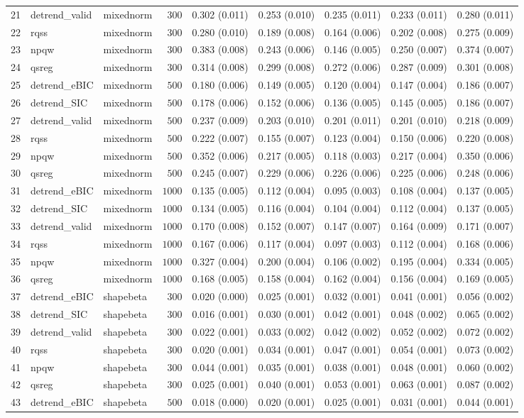 \begin{table}[!tbp]
\begin{center}
\begin{tabular}{lllrlllll}
21&detrend_valid&mixednorm&$ 300$&0.302 (0.011)&0.253 (0.010)&0.235 (0.011)&0.233 (0.011)&0.280 (0.011)\tabularnewline
22&rqss&mixednorm&$ 300$&0.280 (0.010)&0.189 (0.008)&0.164 (0.006)&0.202 (0.008)&0.275 (0.009)\tabularnewline
23&npqw&mixednorm&$ 300$&0.383 (0.008)&0.243 (0.006)&0.146 (0.005)&0.250 (0.007)&0.374 (0.007)\tabularnewline
24&qsreg&mixednorm&$ 300$&0.314 (0.008)&0.299 (0.008)&0.272 (0.006)&0.287 (0.009)&0.301 (0.008)\tabularnewline
25&detrend_eBIC&mixednorm&$ 500$&0.180 (0.006)&0.149 (0.005)&0.120 (0.004)&0.147 (0.004)&0.186 (0.007)\tabularnewline
26&detrend_SIC&mixednorm&$ 500$&0.178 (0.006)&0.152 (0.006)&0.136 (0.005)&0.145 (0.005)&0.186 (0.007)\tabularnewline
27&detrend_valid&mixednorm&$ 500$&0.237 (0.009)&0.203 (0.010)&0.201 (0.011)&0.201 (0.010)&0.218 (0.009)\tabularnewline
28&rqss&mixednorm&$ 500$&0.222 (0.007)&0.155 (0.007)&0.123 (0.004)&0.150 (0.006)&0.220 (0.008)\tabularnewline
29&npqw&mixednorm&$ 500$&0.352 (0.006)&0.217 (0.005)&0.118 (0.003)&0.217 (0.004)&0.350 (0.006)\tabularnewline
30&qsreg&mixednorm&$ 500$&0.245 (0.007)&0.229 (0.006)&0.226 (0.006)&0.225 (0.006)&0.248 (0.006)\tabularnewline
31&detrend_eBIC&mixednorm&$1000$&0.135 (0.005)&0.112 (0.004)&0.095 (0.003)&0.108 (0.004)&0.137 (0.005)\tabularnewline
32&detrend_SIC&mixednorm&$1000$&0.134 (0.005)&0.116 (0.004)&0.104 (0.004)&0.112 (0.004)&0.137 (0.005)\tabularnewline
33&detrend_valid&mixednorm&$1000$&0.170 (0.008)&0.152 (0.007)&0.147 (0.007)&0.164 (0.009)&0.171 (0.007)\tabularnewline
34&rqss&mixednorm&$1000$&0.167 (0.006)&0.117 (0.004)&0.097 (0.003)&0.112 (0.004)&0.168 (0.006)\tabularnewline
35&npqw&mixednorm&$1000$&0.327 (0.004)&0.200 (0.004)&0.106 (0.002)&0.195 (0.004)&0.334 (0.005)\tabularnewline
36&qsreg&mixednorm&$1000$&0.168 (0.005)&0.158 (0.004)&0.162 (0.004)&0.156 (0.004)&0.169 (0.005)\tabularnewline
37&detrend_eBIC&shapebeta&$ 300$&0.020 (0.000)&0.025 (0.001)&0.032 (0.001)&0.041 (0.001)&0.056 (0.002)\tabularnewline
38&detrend_SIC&shapebeta&$ 300$&0.016 (0.001)&0.030 (0.001)&0.042 (0.001)&0.048 (0.002)&0.065 (0.002)\tabularnewline
39&detrend_valid&shapebeta&$ 300$&0.022 (0.001)&0.033 (0.002)&0.042 (0.002)&0.052 (0.002)&0.072 (0.002)\tabularnewline
40&rqss&shapebeta&$ 300$&0.020 (0.001)&0.034 (0.001)&0.047 (0.001)&0.054 (0.001)&0.073 (0.002)\tabularnewline
41&npqw&shapebeta&$ 300$&0.044 (0.001)&0.035 (0.001)&0.038 (0.001)&0.048 (0.001)&0.060 (0.002)\tabularnewline
42&qsreg&shapebeta&$ 300$&0.025 (0.001)&0.040 (0.001)&0.053 (0.001)&0.063 (0.001)&0.087 (0.002)\tabularnewline
43&detrend_eBIC&shapebeta&$ 500$&0.018 (0.000)&0.020 (0.001)&0.025 (0.001)&0.031 (0.001)&0.044 (0.001)\tabularnewline

\end{tabular}
\end{center}
\end{table}

